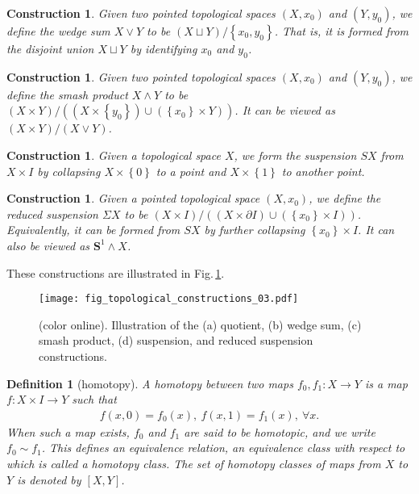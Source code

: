 \documentclass[sort&compress]{elsarticle}
\theoremstyle{theoremstyle}
\theoremstyle{framedtheoremstyle}
\theoremstyle{definitionstyle}
\newtheorem{dfn}[nul]{Definition}%
\theoremstyle{definitionstyle}
\theoremstyle{definitionstyle}
\theoremstyle{definitionstyle}
\newtheorem{cnstr}[nul]{Construction}
\theoremstyle{nameddefinitionstyle}
\theoremstyle{framednameddefinitionstyle}
\theoremstyle{proofstyle}
\theoremstyle{definitionstyle}
\newcommand{\fromto}{\rightarrow}
\renewcommand{\SS}{\mathbf{S}}
\newcommand{\paren}[1]{\left( #1 \right)}
\newcommand{\brackets}[1]{\left[ #1 \right]}
\newcommand{\braces}[1]{\left\{ #1 \right\}}
\begin{document}
\begin{appendices}
\begin{cnstr}
Given two pointed topological spaces $(X,x_0)$ and $(Y, y_0)$, we define the wedge sum $X\vee Y$ to be $\paren{X \sqcup Y}/ \braces{x_0, y_0} $. That is, it is formed from the disjoint union $X \sqcup Y$ by identifying $x_0$ and $y_0$.
\end{cnstr}

\begin{cnstr}
Given two pointed topological spaces $(X,x_0)$ and $(Y, y_0)$, we define the smash product $X\wedge Y$ to be $\paren{X \times Y}/ \paren{ \paren{ X \times \braces{y_0} } \cup \paren{ \braces{x_0} \times Y } }$. It can be viewed as $\paren{X \times Y }/\paren{X \vee Y}$.
\end{cnstr}

\begin{cnstr}
Given a topological space $X$, we form the suspension $SX$ from $X \times I$ by collapsing $X \times \braces{0}$ to a point and $X \times \braces{1}$ to another point.
\end{cnstr}

\begin{cnstr}
Given a pointed topological space $(X,x_0)$, we define the reduced suspension $\Sigma X$ to be $\paren{X \times I}/\paren{\paren{X\times \partial I} \cup \paren{\braces{x_0} \times I}}$. Equivalently, it can be formed from $SX$ by further collapsing $\braces{x_0} \times I$. It can also be viewed as $\SS^1 \wedge X$.
\end{cnstr}

These constructions are illustrated in Fig.\,\ref{fig:topological_construction}.

\begin{figure}[t]
\centering
\texttt{[image: fig\_topological\_constructions\_03.pdf]}
\caption{(color online). Illustration of the (a) quotient, (b) wedge sum, (c) smash product, (d) suspension, and reduced suspension constructions.\label{fig:topological_construction}}
\end{figure}

\begin{dfn}[homotopy]
A homotopy between two maps $f_0, f_1: X \fromto Y$ is a map $f: X \times I \fromto Y$ such that
\begin{eqnarray}
f(x,0) = f_0(x), ~ f(x,1)=f_1(x),~ \forall x.
\end{eqnarray}
When such a map exists, $f_0$ and $f_1$ are said to be homotopic, and we write $f_0 \sim f_1$. This defines an equivalence relation, an equivalence class with respect to which is called a homotopy class. The set of homotopy classes of maps from $X$ to $Y$ is denoted by $\brackets{X, Y}$.
\end{dfn}


\end{appendices}
\end{document}
